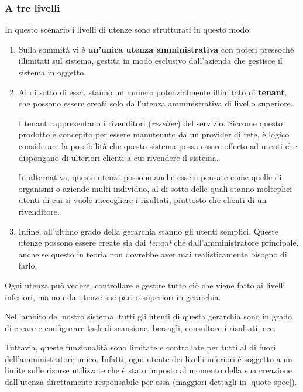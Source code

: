 \subsubsection{A tre livelli}
\label{3-level}
In questo scenario i livelli di utenze sono strutturati in questo modo:
\begin{enumerate}
    \item Sulla sommità vi è \textbf{un'unica utenza amministrativa} con poteri pressoché illimitati sul sistema, gestita in modo esclusivo dall'azienda che gestisce il sistema in oggetto.
    \item Al di sotto di essa, stanno un numero potenzialmente illimitato di \textbf{tenant}, che possono essere creati solo dall'utenza amministrativa di livello superiore.
    
    I tenant rappresentano i rivenditori (\emph{reseller}) del servizio. Siccome questo prodotto è concepito per essere manutenuto da un provider di rete, è logico considerare la possibilità che questo sistema possa essere offerto ad utenti che dispongano di ulteriori clienti a cui rivendere il sistema.
    
    In alternativa, queste utenze possono anche essere pensate come quelle di organismi o aziende multi-individuo, al di sotto delle quali stanno molteplici utenti di cui si vuole raccogliere i risultati, piuttosto che clienti di un rivenditore.
    \item Infine, all'ultimo grado della gerarchia stanno gli utenti semplici. Queste utenze possono essere create sia dai \emph{tenant} che dall'amministratore principale, anche se questo in teoria non dovrebbe aver mai realisticamente bisogno di farlo.
\end{enumerate}
Ogni utenza può vedere, controllare e gestire tutto ciò che viene fatto ai livelli inferiori, ma non da utenze sue pari o superiori in gerarchia.

Nell'ambito del nostro sistema, tutti gli utenti di questa gerarchia sono in grado di creare e configurare task di scansione, bersagli, consultare i risultati, ecc.

Tuttavia, queste funzionalità sono limitate e controllate per tutti al di fuori dell'amministratore unico. Infatti, ogni utente dei livelli inferiori è soggetto a un limite sulle risorse utilizzate che è stato imposto al momento della sua creazione dall'utenza direttamente responsabile per essa (maggiori dettagli in \ref{quote-spec}).

